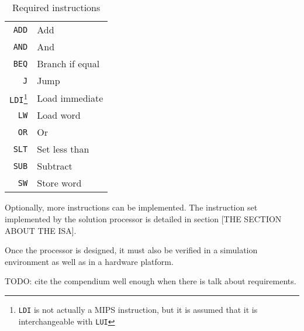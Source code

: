 \begin{table}
    \begin{center}
        \begin{tabular}{r|l}
            \texttt{ADD} & Add \\
            \texttt{AND} & And \\
            \texttt{BEQ} & Branch if equal \\
            \texttt{J} & Jump \\
            \texttt{LDI}\footnote{\texttt{LDI} is not actually a MIPS instruction, but it is assumed that it is interchangeable with \texttt{LUI}} & Load immediate \\
            \texttt{LW} & Load word \\
            \texttt{OR} & Or \\
            \texttt{SLT} & Set less than \\
            \texttt{SUB} & Subtract \\
            \texttt{SW} & Store word \\
            \hline
        \end{tabular}
        \smallskip
        \smallskip
        \caption{Required instructions}
        \label{table:required-instructions}
    \end{center}
\end{table}

Optionally, more instructions can be implemented.
The instruction set implemented by the solution processor is detailed in section [THE SECTION ABOUT THE ISA].

Once the processor is designed, it must also be verified in a simulation environment as well as in a hardware platform.

TODO: cite the compendium well enough when there is talk about requirements.
